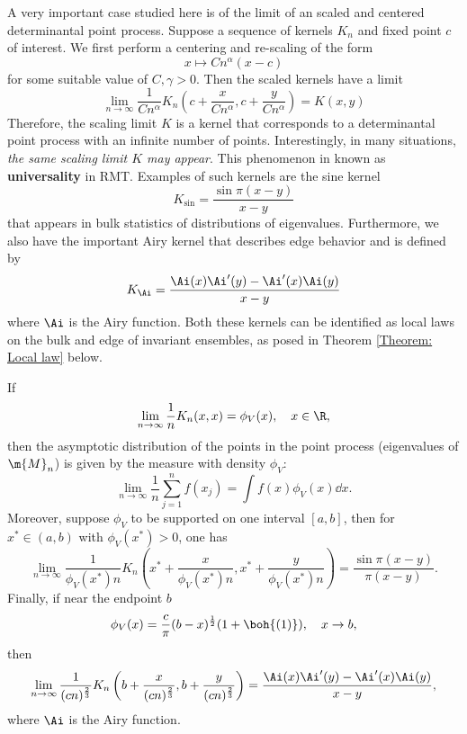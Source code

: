A very important case studied here is of the limit of an scaled and centered determinantal point process. Suppose a sequence of kernels $K_n$ and fixed point $c$ of interest. We first perform a centering and re-scaling of the form
\begin{equation}
	x \mapsto Cn^\alpha (x - c)
\end{equation} 
for some suitable value of $C, \gamma > 0$. Then the scaled kernels have a limit
\begin{equation}
	\lim_{n \rightarrow \infty} \frac{1}{C n^\alpha} K_n \left( c + \frac{x}{C n^\alpha}, c + \frac{y}{C n^\alpha} \right) = K(x, y)
\end{equation}
Therefore, the scaling limit $K$ is a kernel that corresponds to a determinantal point process with
an infinite number of points.  Interestingly, in many situations, \textit{the same scaling limit $K$ may appear}. This phenomenon in known as \textbf{universality} in RMT. Examples of such kernels are the sine kernel
\begin{equation}
	K_{\sin} = \frac{\sin \pi(x - y)}{x - y}
\end{equation}
that appears in bulk statistics of distributions of eigenvalues. Furthermore, we also have the important Airy kernel that describes edge behavior and is defined by
\begin{equation}
	K_{\Ai} = \frac{\Ai(x)\Ai'(y) - \Ai'(x) \Ai(y)}{x - y}
\end{equation}
where $\Ai$ is the Airy function. Both these kernels can be identified as local laws on the bulk and edge of invariant ensembles, as posed in Theorem \ref{Theorem: Local law} below.

\begin{teorema}
	If
	\begin{equation}
		\lim_{n \rightarrow \infty} \frac{1}{n} K_n(x,x) = \phi_V(x), \quad x \in \R,
	\end{equation}	
	then the asymptotic distribution of the points in the point process (eigenvalues of $\m{M}_n$) is given by the measure with density $\phi_V$:
	\begin{equation}
		\lim_{n \rightarrow \infty} \frac{1}{n} \sum_{j=1}^{n} f(x_j) = \int f(x) \phi_V(x) \dd x.
	\end{equation}
	Moreover, suppose $\phi_V$ to be supported on one interval $[a,b]$, then for $x^* \in (a, b)$ with $\phi_V(x^*) > 0$, one has
	\begin{equation}
		\lim_{n \rightarrow \infty} \frac{1}{\phi_V(x^*) n} K_n\left(x^* + \frac{x}{\phi_V(x^*)n}, x^* + \frac{y}{\phi_V(x^*)n}\right) = \frac{\sin \pi(x - y)}{\pi(x - y)}.
	\end{equation}
	Finally, if near the endpoint $b$
	\begin{equation}
		\phi_V(x) = \frac{c}{\pi} (b-x)^{\frac{1}{2}} (1 + \boh{(1)}), \quad x \rightarrow b,
	\end{equation}
	then
	\begin{equation}
		\lim_{n \rightarrow \infty} \frac{1}{(cn)^{\frac{2}{3}}} K_n\left(b + \frac{x}{(cn)^{\frac{2}{3}}}, b + \frac{y}{(cn)^{\frac{2}{3}}}\right) = \frac{\Ai(x) \Ai'(y) - \Ai'(x) \Ai(y)}{x - y},
	\end{equation}
	where $\Ai$ is the Airy function.
	\label{Theorem: Local law}
\end{teorema}